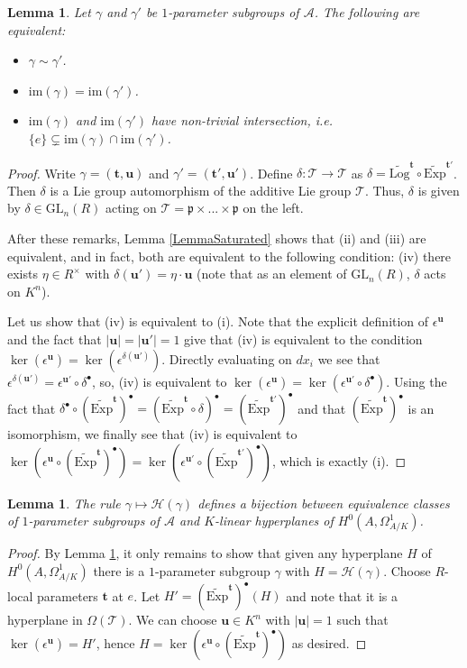 \documentclass[11pt]{amsart}
\newtheorem{lemma}[theorem]{Lemma}
\theoremstyle{remark}
\numberwithin{equation}{section}
\newcommand{\pfrak}{\mathfrak{p}}
\newcommand{\Acal}{\mathscr{A}}
\newcommand{\Hcal}{\mathscr{H}}
\newcommand{\Tcal}{\mathscr{T}}
\newcommand{\ttt}{\mathbf{t}}
\newcommand{\uu}{\mathbf{u}}
\newcommand{\Exp}{\mathrm{Exp}}
\newcommand{\Log}{\mathrm{Log}}
\newcommand{\GL}{\mathrm{GL}}
\newcommand{\im}{\mathrm{im}}
\begin{document}
\begin{lemma} \label{LemmaEquiv1PS} Let $\gamma$ and $\gamma'$ be $1$-parameter subgroups of $\Acal$. The following are equivalent:
\begin{itemize}
\item[(i)] $\gamma\sim\gamma'$.
\item[(ii)] $\im(\gamma)=\im(\gamma')$.
\item[(iii)] $\im(\gamma)$ and $\im(\gamma')$ have non-trivial intersection, i.e. $\{e\}\subsetneq \im(\gamma)\cap\im(\gamma')$.
\end{itemize}
\end{lemma}
\begin{proof}
Write $\gamma=(\ttt,\uu)$ and $\gamma'=(\ttt',\uu')$. Define $\delta:\Tcal\to \Tcal$ as $\delta=\widetilde{\Log}^\ttt\circ \widetilde{\Exp}^{\ttt'}$. Then $\delta$ is a Lie group automorphism of the additive Lie group $\Tcal$. Thus, $\delta$ is given by $\delta\in \GL_n(R)$ acting on $\Tcal=\pfrak\times...\times \pfrak$ on the left.

After these remarks, Lemma \ref{LemmaSaturated} shows that (ii) and (iii) are equivalent, and in fact, both are equivalent to the following condition: (iv) there exists $\eta\in R^\times$ with $\delta(\uu') = \eta\cdot \uu$ (note that as an element of $\GL_n(R)$, $\delta$ acts on $K^n$).

Let us show that (iv) is equivalent to (i). Note that the explicit definition of $\epsilon^{\uu}$ and the fact that $|\uu|=|\uu'|=1$ give that (iv) is equivalent to the condition $\ker(\epsilon^\uu) = \ker(\epsilon^{\delta(\uu')})$. Directly evaluating on $dx_i$ we see that $\epsilon^{\delta(\uu')}=\epsilon^{\uu'}\circ \delta^\bullet$, so, (iv) is equivalent to $\ker(\epsilon^\uu) = \ker(\epsilon^{\uu'}\circ \delta^\bullet)$. Using the fact that $\delta^\bullet\circ (\widetilde{\Exp}^{\ttt})^\bullet=(\widetilde{\Exp}^{\ttt}\circ \delta)^\bullet =( \widetilde{\Exp}^{\ttt'})^\bullet$ and that $( \widetilde{\Exp}^{\ttt})^\bullet$ is an isomorphism, we finally see that (iv) is equivalent to
$\ker(\epsilon^\uu\circ( \widetilde{\Exp}^{\ttt})^\bullet)=\ker(\epsilon^{\uu'}\circ( \widetilde{\Exp}^{\ttt'})^\bullet)$, which is exactly (i).
\end{proof}

\begin{lemma}\label{LemmaH1PS} The rule $\gamma\mapsto \Hcal(\gamma)$ defines a bijection between equivalence classes of $1$-parameter subgroups of $\Acal$ and $K$-linear hyperplanes of $H^0(A,\Omega^1_{A/K})$.
\end{lemma}
\begin{proof} By Lemma \ref{LemmaEquiv1PS}, it only remains to show that given any hyperplane $H$ of $H^0(A,\Omega^1_{A/K})$ there is a $1$-parameter subgroup $\gamma$ with $H=\Hcal(\gamma)$. Choose $R$-local parameters $\ttt$ at $e$. Let $H'=(\widetilde{\Exp}^\ttt)^\bullet(H)$ and note that it is a hyperplane in $\Omega(\Tcal)$. We can choose $\uu\in K^n$ with $|\uu|=1$ such that $\ker(\epsilon^\uu)=H'$, hence $H=\ker(\epsilon^\uu\circ (\widetilde{\Exp}^\ttt)^\bullet)$ as desired.
\end{proof}
\end{document}
